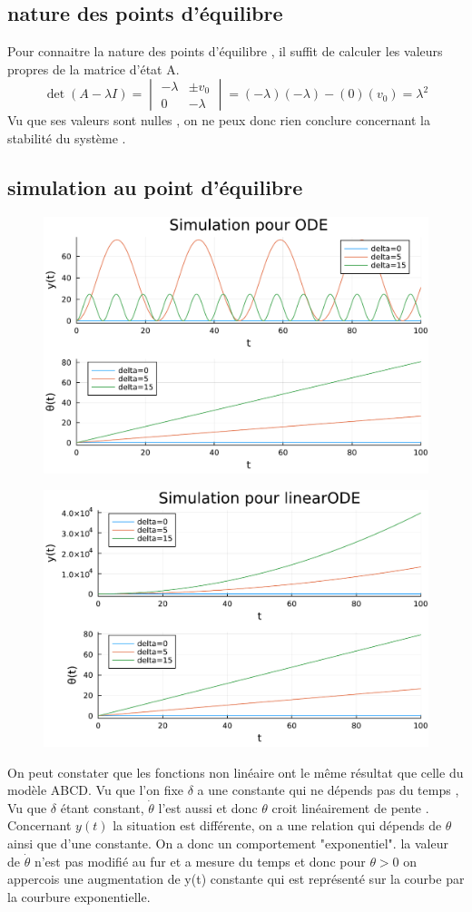 \documentclass[11pt,a4paper]{article}
\begin{document}
\subsection{nature des points d'équilibre}
Pour connaitre la nature des points d'équilibre , il suffit de calculer les valeurs propres de la matrice d'état A.
$$
\det(A - \lambda I) = 
\begin{vmatrix}
-\lambda &\pm v_0 \\
0 & -\lambda
\end{vmatrix}
= (-\lambda)(-\lambda) - (0)(v_0) = \lambda^2
$$
Vu que ses valeurs sont nulles , on ne peux donc rien conclure concernant la stabilité du système .

\subsection{simulation au point d'équilibre}



\begin{figure}[!h]
	\centering
	\includegraphics[width=0.5\linewidth]{jlplots/Q1_7_ODE.pdf}
\end{figure}
\begin{figure}[!h]
	\centering
	\includegraphics[width=0.5\linewidth]{jlplots/Q1_7_linearODE.pdf}
\end{figure}
On peut constater que les fonctions non linéaire ont le même résultat que celle du modèle ABCD.
Vu que l'on fixe $\delta$ a une constante qui ne dépends pas du temps , 
Vu que $\delta$ étant constant, $\dot \theta$ l'est aussi et donc $\theta$ croit linéairement de pente . \\
Concernant $y(t)$ la situation est différente, on a une relation qui dépends de $\theta$ ainsi que d'une constante. On a donc un comportement "exponentiel".
la valeur de $\dot \theta$ n'est pas modifié au fur et a mesure du temps et donc pour $\theta>0 $ on appercois une augmentation de y(t) constante qui est représenté sur la courbe par la courbure exponentielle.
\end{document}
